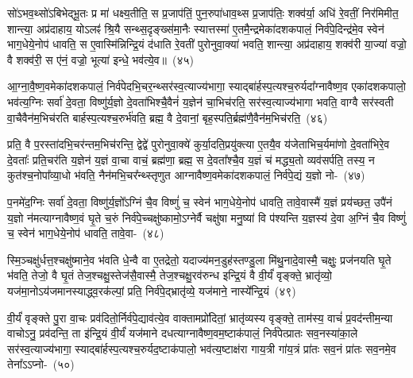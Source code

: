 सो॑\-ऽभव॒थ्सो॑\-ऽबिभेद्भू॒तः प्र मा॑ धक्ष्य॒तीति॒ स प्र॒जा\-प॑तिं॒ पुन॒रुपा॑धाव॒थ्स प्र॒जा\-प॑तिः॒ शक्व॑र्या॒ अधि॑ रे॒वतीं॒ निर॑मिमीत॒ शान्त्या॒ अप्र॑दाहाय॒ यो\-ऽलꣴ॑ श्रि॒यै सन्थ्स॒दृङ्ख्स॑मा॒नैः स्यात्तस्मा॑ ए॒तमै॒न्द्रमेका॑\-दश\-कपालं॒ निर्व॑पे॒दिन्द्र॑मे॒व स्वेन॑ भाग॒\-धेये॒नोप॑ धावति॒ स ए॒वास्मि॑न्निन्द्रि॒यं द॑धाति रे॒वती॑ पुरोनुवा॒क्या॑ भवति॒ शान्त्या॒ अप्र॑दाहाय॒ शक्व॑री या॒ज्या॑ वज्रो॒ वै शक्व॑री॒ स ए॑नं॒ वज्रो॒ भूत्या॑ इन्धे॒ भव॑त्ये॒व॥~(४५)\ip

{\anuvakamend[{अपि॒ तꣴ स्यु॑र्वैन्ध भवति॒ चतु॑र्दश च}]}

आ॒ग्ना॒वै॒ष्ण॒वमेका॑दशकपालं॒ निर्व॑पेदभि॒चर॒न्थ्सर॑स्व॒त्याज्य॑\-भागा॒ स्याद्बा॑र्\mbox{}हस्प॒त्य\-श्च॒रुर्यदा᳚ग्नावैष्ण॒व एका॑\-दश\-कपालो॒ भव॑त्य॒ग्निः सर्वा॑ दे॒वता॒ विष्णु॑र्य॒ज्ञो दे॒वता॑भिश्चै॒वैनं॑ य॒ज्ञेन॑ चा॒भिच॑रति॒ सर॑स्व॒त्याज्य॑भागा भवति॒ वाग्वै सर॑स्वती वा॒चैवैन॑म॒भिच॑रति बार्\mbox{}हस्प॒त्यश्च॒रुर्भ॑वति॒ ब्रह्म॒ वै दे॒वानां॒ बृह॒स्पति॒र्ब्रह्म॑णै॒वैन॑म॒भिच॑रति॒~(४६)\ip

प्रति॒ वै प॒रस्ता॑दभि॒चर॑न्तम॒भिच॑रन्ति॒ द्वेद्वे॑ पुरोनुवा॒क्ये॑ कुर्या॒दति॒प्रयु॑क्त्या ए॒तयै॒व य॑जेताभिच॒र्यमा॑णो दे॒वता॑भिरे॒व दे॒वताः᳚ प्रति॒चर॑ति य॒ज्ञेन॑ य॒ज्ञं वा॒चा वाचं॒ ब्रह्म॑णा॒ ब्रह्म॒ स दे॒वता᳚श्चै॒व य॒ज्ञं च॑ मद्ध्य॒तो व्यव॑सर्पति॒ तस्य॒ न कुत॑श्च॒नोपा᳚व्या॒धो भ॑वति॒ नैन॑मभि॒चर᳚न्थ्स्तृणुत आग्नावैष्ण॒वमेका॑\-दश\-कपालं॒ निर्व॑पे॒द्यं य॒ज्ञो नो-~(४७)\ip

प॒नमे॑द॒ग्निः सर्वा॑ दे॒वता॒ विष्णु॑र्य॒ज्ञो᳚\-ऽग्निं चै॒व विष्णुं॑ च॒ स्वेन॑ भाग॒\-धेये॒नोप॑ धावति॒ तावे॒वास्मै॑ य॒ज्ञं प्रय॑च्छत॒ उपै॑नं य॒ज्ञो न॑मत्याग्नावैष्ण॒वं घृ॒ते च॒रुं निर्व॑पे॒च्चक्षु॑ष्कामो॒\-ऽग्नेर्वै चक्षु॑षा मनु॒ष्या॑ वि प॑श्यन्ति य॒ज्ञस्य॑ दे॒वा अ॒ग्निं चै॒व विष्णुं॑ च॒ स्वेन॑ भाग॒\-धेये॒नोप॑ धावति॒ तावे॒वा-~(४८)\ip

स्मि॒ञ्चक्षु॑र्धत्त॒श्चक्षु॑ष्माने॒व भ॑वति धे॒न्वै वा ए॒तद्रेतो॒ यदाज्य॑मन॒डुह॑स्तण्डु॒ला मि॑थु॒नादे॒वास्मै॒ चक्षुः॒ प्रज॑नयति घृ॒ते भ॑वति॒ तेजो॒ वै घृ॒तं तेज॒श्चक्षु॒स्तेज॑सै॒वास्मै॒ तेज॒श्चक्षु॒रव॑रुन्ध इन्द्रि॒यं वै वी॒र्यं॑ वृङ्क्ते॒ भ्रातृ॑व्यो॒ यज॑मा॒नो\-ऽय॑जमानस्याद्ध्व॒रक॑ल्पां॒ प्रति॒ निर्व॑पे॒द्भ्रातृ॑व्ये॒ यज॑माने॒ नास्ये᳚न्द्रि॒यं~(४९)\ip

वी॒र्यं॑ वृङ्क्ते पु॒रा वा॒चः प्रव॑दितो॒र्निर्व॑पे॒द्याव॑त्ये॒व वाक्तामप्रो॑दितां॒ भ्रातृ॑व्यस्य वृङ्क्ते॒ ताम॑स्य॒ वाचं॑ प्र॒वद॑न्तीम॒न्या वाचो\-ऽनु॒ प्रव॑दन्ति॒ ता इ॑न्द्रि॒यं वी॒र्यं॑ यज॑माने दधत्याग्ना\-वैष्ण॒व\-म॒ष्टा\-क॑पालं॒ निर्व॑पेत्प्रातः सव॒नस्या॑का॒ले सर॑स्व॒त्याज्य॑भागा॒ स्याद्बा॑र्\mbox{}हस्प॒त्यश्च॒रुर्यद॒ष्टाक॑पालो॒ भव॑त्य॒ष्टाक्ष॑रा गाय॒त्री गा॑य॒त्रं प्रा॑तः सव॒नं प्रा॑तः सव॒नमे॒व तेना᳚\-ऽऽ\-प्नो-~(५०)\ip

